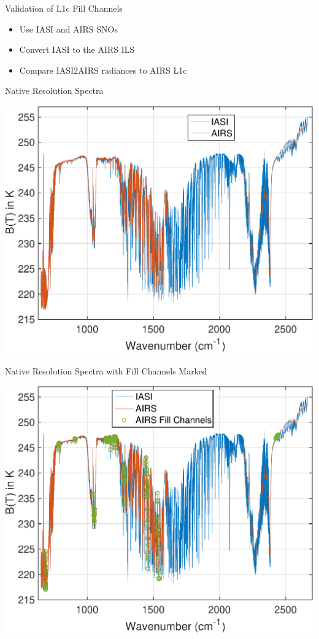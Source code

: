 \documentclass[10pt,t]{beamer}
\begin{document}
\begin{frame}[label={sec:org9359b0c}]{Validation of L1c Fill Channels}
\begin{itemize}
\item Use IASI and AIRS SNOs
\item Convert IASI to the AIRS ILS
\item Compare IASI2AIRS radiances to AIRS L1c
\end{itemize}
\end{frame}
\begin{frame}[label={sec:org2ec2273}]{Native Resolution Spectra}
\begin{center}
\includegraphics[width=0.8\linewidth]{./Figs/Pdf/airs_iasi_sno_native.pdf}
\end{center}
\end{frame}
\begin{frame}[label={sec:org7b222d0}]{Native Resolution Spectra with Fill Channels Marked}
\begin{center}
\includegraphics[width=0.8\linewidth]{./Figs/Pdf/airs_iasi_sno_native_with_fill_marked.pdf}
\end{center}
\end{frame}
\end{document}
